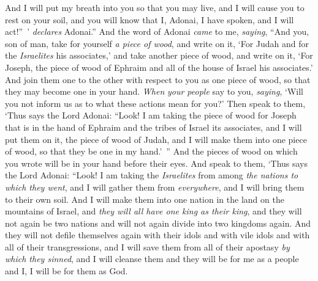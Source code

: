 \begin{biblechapter}
\verse And I will put my breath into you so that you may live, and I will cause you to rest on your soil, and you will know that I, Adonai, I have spoken, and I will act!” ’ \textit{declares} Adonai.”
\verse And the word of Adonai \textit{came} to me, \textit{saying},
\verse “And you, son of man, take for yourself \textit{a piece of wood}, and write on it, ‘For Judah and for the \textit{Israelites} his associates,’ and take another piece of wood, and write on it, ‘For Joseph, the piece of wood of Ephraim and all of the house of Israel his associates.’
\verse And join them one to the other with respect to you as one piece of wood, so that they may become one in your hand.
\verse \textit{When} \textit{your people} say to you, \textit{saying}, ‘Will you not inform us as to what these actions mean for you?’
\verse Then speak to them, ‘Thus says the Lord Adonai: “Look! I am taking the piece of wood for Joseph that is in the hand of Ephraim and the tribes of Israel its associates, and I will put them on it, the piece of wood of Judah, and I will make them into one piece of wood, so that they be one in my hand.’ ”
\verse And the pieces of wood on which you wrote will be in your hand before their eyes.
\verse And speak to them, ‘Thus says the Lord Adonai: “Look! I am taking the \textit{Israelites} from among \textit{the nations to which they went}, and I will gather them from \textit{everywhere}, and I will bring them to their own soil.
\verse And I will make them into one nation in the land on the mountains of Israel, and \textit{they will all have one king as their king}, and they will not again be two nations and will not again divide into two kingdoms again.
\verse And they will not defile themselves again with their idols and with vile idols and with all of their transgressions, and I will save them from all of their apostasy \textit{by which they sinned}, and I will cleanse them and they will be for me as a people and I, I will be for them as God.

\end{biblechapter}
